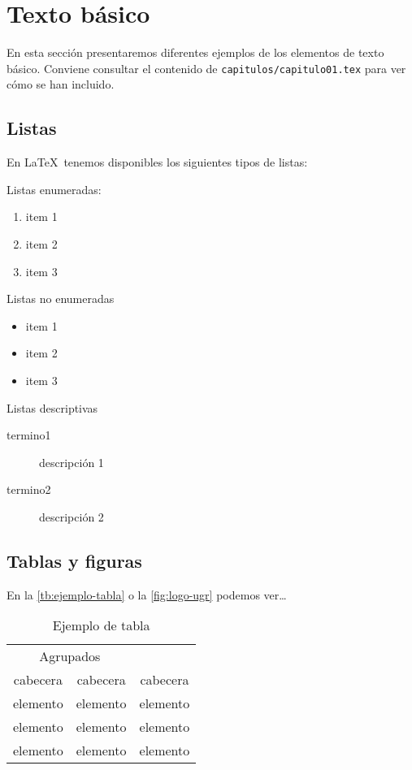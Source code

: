 \section{Texto básico}

En esta sección presentaremos diferentes ejemplos de los elementos de texto básico. Conviene consultar el contenido de \texttt{capitulos/capitulo01.tex} para ver cómo se han incluido.

\subsection{Listas}
En \LaTeX\ tenemos disponibles los siguientes tipos de listas:

Listas enumeradas:
\begin{enumerate}
  \item item 1
  \item item 2
  \item item 3
\end{enumerate}

Listas no enumeradas
\begin{itemize}
  \item item 1
  \item item 2
  \item item 3
  \end{itemize}

Listas descriptivas
\begin{description}
  \item[termino1] descripción 1
  \item[termino2] descripción 2
\end{description}
  
\subsection{Tablas y figuras}

En la \autoref{tb:ejemplo-tabla} o la \autoref{fig:logo-ugr} podemos ver\ldots

\begin{table}[htpb]
  \centering
  \begin{tabular}{ccc} \toprule
    \multicolumn{2}{c}{Agrupados} \\ \cmidrule(r){1-2}
    cabecera & cabecera & cabecera          \\ \midrule
    elemento & elemento & elemento          \\ 
    elemento & elemento & elemento          \\ 
    elemento & elemento & elemento          \\ \bottomrule
  \end{tabular}
  \caption{Ejemplo de tabla}
  \label{tb:ejemplo-tabla}
\end{table}

